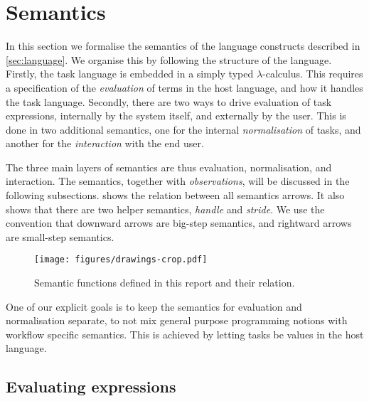 


\section{Semantics}
\label{sec:semantics}


In this section we formalise the semantics of the language constructs described in \cref{sec:language}.
We organise this by following the structure of the language.
Firstly, the task language is embedded in a simply typed $\lambda$-calculus.
This requires a specification of the \emph{evaluation} of terms in the host language, and how it handles the task language.
Secondly, there are two ways to drive evaluation of task expressions, internally by the system itself, and externally by the user.
This is done in two additional semantics, one for the internal \emph{normalisation} of tasks, and another for the \emph{interaction} with the end user.

The three main layers of semantics are thus evaluation, normalisation, and interaction.
The semantics, together with \emph{observations}, will be discussed in the following subsections.
 shows the relation between all semantics arrows.
It also shows that there are two helper semantics, \emph{handle} and \emph{stride}.
We use the convention that downward arrows are big-step semantics, and rightward arrows are small-step semantics.

\begin{figure}[h]
  \centering
  \texttt{[image: figures/drawings-crop.pdf]}
  \caption{
    Semantic functions defined in this report and their relation.
  }
  \label{fig:semantic-functions}
\end{figure}

One of our explicit goals is to keep the semantics for evaluation and normalisation separate,
to not mix general purpose programming notions with workflow specific semantics.
This is achieved by letting tasks be values in the host language.



\subsection{Evaluating expressions}
\label{sec:evaluation}

